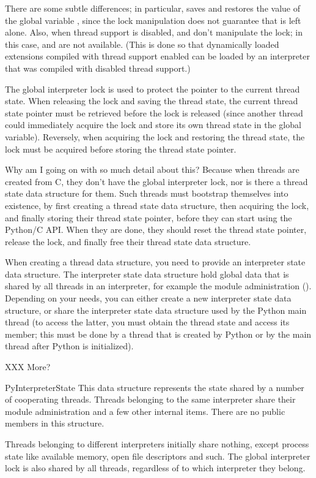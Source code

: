 There are some subtle differences; in particular,
 saves and restores the value of the
global variable , since the lock manipulation does not
guarantee that  is left alone.  Also, when thread support
is disabled,  and
 don't manipulate the lock; in this case,
 and  are not
available.  (This is done so that dynamically loaded extensions
compiled with thread support enabled can be loaded by an interpreter
that was compiled with disabled thread support.)

The global interpreter lock is used to protect the pointer to the
current thread state.  When releasing the lock and saving the thread
state, the current thread state pointer must be retrieved before the
lock is released (since another thread could immediately acquire the
lock and store its own thread state in the global variable).
Reversely, when acquiring the lock and restoring the thread state, the
lock must be acquired before storing the thread state pointer.

Why am I going on with so much detail about this?  Because when
threads are created from C, they don't have the global interpreter
lock, nor is there a thread state data structure for them.  Such
threads must bootstrap themselves into existence, by first creating a
thread state data structure, then acquiring the lock, and finally
storing their thread state pointer, before they can start using the
Python/C API.  When they are done, they should reset the thread state
pointer, release the lock, and finally free their thread state data
structure.

When creating a thread data structure, you need to provide an
interpreter state data structure.  The interpreter state data
structure hold global data that is shared by all threads in an
interpreter, for example the module administration
().  Depending on your needs, you can either create
a new interpreter state data structure, or share the interpreter state
data structure used by the Python main thread (to access the latter,
you must obtain the thread state and access its  member;
this must be done by a thread that is created by Python or by the main
thread after Python is initialized).

XXX More?

\begin{ctypedesc}{PyInterpreterState}
This data structure represents the state shared by a number of
cooperating threads.  Threads belonging to the same interpreter
share their module administration and a few other internal items.
There are no public members in this structure.

Threads belonging to different interpreters initially share nothing,
except process state like available memory, open file descriptors and
such.  The global interpreter lock is also shared by all threads,
regardless of to which interpreter they belong.
\end{ctypedesc}

